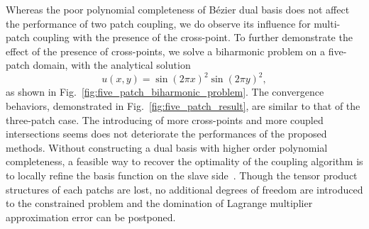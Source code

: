 \documentclass[preprint,12pt]{elsarticle}
\theoremstyle{remark}
\begin{document}
Whereas the poor polynomial completeness of B\'ezier dual basis does not affect the performance of two patch coupling, we do observe its influence for multi-patch coupling with the presence of the cross-point. To further demonstrate the effect of the presence of cross-points, we solve a biharmonic problem on a five-patch domain, with the analytical solution
\begin{equation}
    u(x,y)=\sin(2\pi{x})^2\sin(2\pi{y})^2,
\end{equation}
as shown in Fig.~\ref{fig:five_patch_biharmonic_problem}. The convergence behaviors, demonstrated in Fig.~\ref{fig:five_patch_result}, are similar to that of the three-patch case. The introducing of more cross-points and more coupled intersections seems does not deteriorate the performances of the proposed methods. Without constructing a dual basis with higher order polynomial completeness, a feasible way to recover the optimality of the coupling algorithm is to locally refine the basis function on the slave side~\cite{zou2018isogeometric}. Though the tensor product structures of each patchs are lost, no additional degrees of freedom are introduced to the constrained problem and the domination of Lagrange multiplier approximation error can be postponed. 
\end{document}
